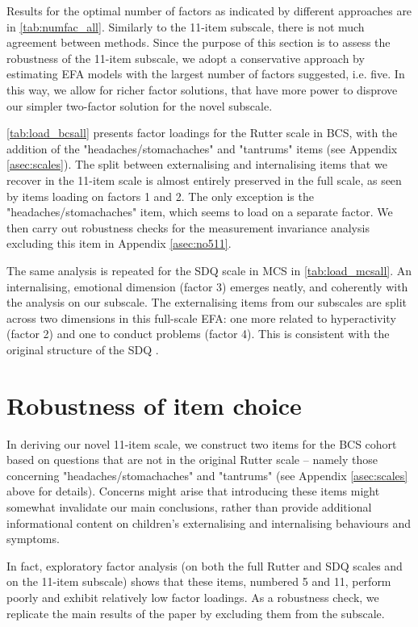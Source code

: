 Results for the optimal number of factors as indicated by different approaches are in \autoref{tab:numfac_all}. Similarly to the 11-item subscale, there is not much agreement between methods. Since the purpose of this section is to assess the robustness of the 11-item subscale, we adopt a conservative approach by estimating EFA models with the largest number of factors suggested, i.e. five. In this way, we allow for richer factor solutions, that have more power to disprove our simpler two-factor solution for the novel subscale.

\autoref{tab:load_bcsall} presents factor loadings for the Rutter scale in BCS, with the addition of the "headaches/stomachaches" and "tantrums" items (see Appendix \autoref{asec:scales}). The split between externalising and internalising items that we recover in the 11-item scale is almost entirely preserved in the full scale, as seen by items loading on factors 1 and 2. The only exception is the "headaches/stomachaches" item, which seems to load on a separate factor. We then carry out robustness checks for the measurement invariance analysis excluding this item in Appendix \autoref{asec:no511}.

The same analysis is repeated for the SDQ scale in MCS in \autoref{tab:load_mcsall}. An internalising, emotional dimension (factor 3) emerges neatly, and coherently with the analysis on our subscale. The externalising items from our subscales are split across two dimensions in this full-scale EFA: one more related to hyperactivity (factor 2) and one to conduct problems (factor 4). This is consistent with the original structure of the SDQ \citep{Goodman1997}.


\section{Robustness of item choice}\label{asec:no511}

In deriving our novel 11-item scale, we construct two items for the BCS cohort based on questions that are not in the original Rutter scale -- namely those concerning "headaches/stomachaches" and "tantrums" (see Appendix \autoref{asec:scales} above for details). Concerns might arise that introducing these items might somewhat invalidate our main conclusions, rather than provide additional informational content on children's externalising and internalising behaviours and symptoms.

In fact, exploratory factor analysis (on both the full Rutter and SDQ scales and on the 11-item subscale) shows that these items, numbered 5 and 11, perform poorly and exhibit relatively low factor loadings. As a robustness check, we replicate the main results of the paper by excluding them from the subscale.

